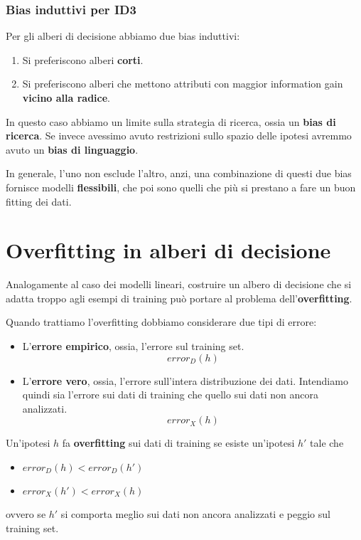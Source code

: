 \subsubsection{Bias induttivi per ID3}
Per gli alberi di decisione abbiamo due bias induttivi:
\begin{enumerate}
	\item Si preferiscono alberi \textbf{corti}.
	\item Si preferiscono alberi che mettono attributi con maggior information gain \textbf{vicino alla radice}.
\end{enumerate}
In questo caso abbiamo un limite sulla strategia di ricerca, ossia un \textbf{bias di ricerca}. Se invece avessimo avuto
restrizioni sullo spazio delle ipotesi avremmo avuto un \textbf{bias di linguaggio}.

In generale, l'uno non esclude l'altro, anzi, una combinazione di questi due bias fornisce modelli \textbf{flessibili},
che poi sono quelli che pi\`u si prestano a fare un buon fitting dei dati.

\section{Overfitting in alberi di decisione}
Analogamente al caso dei modelli lineari, costruire un albero di decisione che si adatta troppo agli esempi di training
pu\`o portare al problema dell'\textbf{overfitting}.

Quando trattiamo l'overfitting dobbiamo considerare due tipi di errore:
\begin{itemize}
	\item L'\textbf{errore empirico}, ossia, l'errore sul training set.
	      \[ error_D(h) \]
	\item L'\textbf{errore vero}, ossia, l'errore sull'intera distribuzione dei dati. Intendiamo quindi sia l'errore sui
	      dati di training che quello sui dati non ancora analizzati.
	      \[ error_X(h) \]
\end{itemize}

\begin{definition}
	Un'ipotesi $h$ fa \textbf{overfitting} sui dati di training se esiste un'ipotesi $h'$ tale che
	\begin{itemize}
		\item $error_D(h) < error_D(h')$
		\item $error_X(h') < error_X(h)$
	\end{itemize}
	ovvero se $h'$ si comporta meglio sui dati non ancora analizzati e peggio sul training set.
\end{definition}

